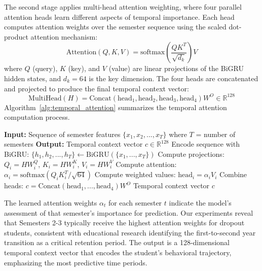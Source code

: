 \documentclass[journal]{IEEEtran}
\begin{document}
The second stage applies multi-head attention weighting, where four parallel attention heads learn different aspects of temporal importance. Each head computes attention weights over the semester sequence using the scaled dot-product attention mechanism:
\begin{equation}
\text{Attention}(Q, K, V) = \text{softmax}\left(\frac{QK^T}{\sqrt{d_k}}\right)V
\end{equation}
where $Q$ (query), $K$ (key), and $V$ (value) are linear projections of the BiGRU hidden states, and $d_k = 64$ is the key dimension. The four heads are concatenated and projected to produce the final temporal context vector:
\begin{equation}
\text{MultiHead}(H) = \text{Concat}(\text{head}_1, \text{head}_2, \text{head}_3, \text{head}_4)W^O \in \mathbb{R}^{128}
\end{equation}
Algorithm~\ref{alg:temporal_attention} summarizes the temporal attention computation process.

\begin{algorithm}[h]
\caption{Temporal Attention Computation}
\label{alg:temporal_attention}
\begin{algorithmic}[1]
\STATE \textbf{Input:} Sequence of semester features $\{x_1, x_2, ..., x_T\}$ where $T$ = number of semesters
\STATE \textbf{Output:} Temporal context vector $c \in \mathbb{R}^{128}$
\STATE Encode sequence with BiGRU: $\{h_1, h_2, ..., h_T\} \leftarrow \text{BiGRU}(\{x_1, ..., x_T\})$
    \STATE Compute projections: $Q_i = HW_i^Q$, $K_i = HW_i^K$, $V_i = HW_i^V$
    \STATE Compute attention: $\alpha_i = \text{softmax}(Q_i K_i^T / \sqrt{64})$
    \STATE Compute weighted values: $\text{head}_i = \alpha_i V_i$
\ENDFOR
\STATE Combine heads: $c = \text{Concat}(\text{head}_1, ..., \text{head}_4)W^O$
\RETURN Temporal context vector $c$
\end{algorithmic}
\end{algorithm}

The learned attention weights $\alpha_t$ for each semester $t$ indicate the model's assessment of that semester's importance for prediction. Our experiments reveal that Semesters 2-3 typically receive the highest attention weights for dropout students, consistent with educational research identifying the first-to-second year transition as a critical retention period. The output is a 128-dimensional temporal context vector that encodes the student's behavioral trajectory, emphasizing the most predictive time periods.
\end{document}
